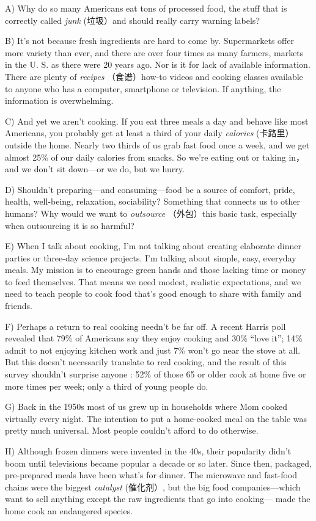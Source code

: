 \documentclass[UTF8,11pt]{ctexart}
\begin{document}
A) Why do so many Americans eat tons of processed food, the stuff that is correctly called\textit{ junk} (垃圾）and should really carry warning labels?


B) It’s not because fresh ingredients are hard to come by. Supermarkets offer more variety than ever, and there are over four times as many farmers, markets in the U. S. as there were 20 years ago. Nor is it for lack of available information. There are plenty of\textit{ recipes} （食谱）how-to videos and cooking classes available to anyone who has a computer, smartphone or television. If anything, the information is overwhelming.


C) And yet we aren’t cooking. If you eat three meals a day and behave like most Americans, you probably get at least a third of your daily\textit{ calories} (卡路里）outside the home. Nearly two thirds of us grab fast food once a week, and we get almost 25\% of our daily calories from snacks. So we’re eating out or taking in，and we don’t sit down—or we do, but we hurry.


D) Shouldn’t preparing—and consuming—food be a source of comfort, pride, health, well-being, relaxation, sociability? Something that connects us to other humans? Why would we want to\textit{ outsource} （外包）this basic task, especially when outsourcing it is so harmful?


E) When I talk about cooking, I’m not talking about creating elaborate dinner parties or three-day science projects. I’m talking about simple, easy, everyday meals. My mission is to encourage green hands and those lacking time or money to feed themselves. That means we need modest, realistic expectations, and we need to teach people to cook food that’s good enough to share with family and friends.


F) Perhaps a return to real cooking needn’t be far off. A recent Harris poll revealed that 79\% of Americans say they enjoy cooking and 30\% “love it”; 14\% admit to not enjoying kitchen work and just 7\% won’t go near the stove at all. But this doesn’t necessarily translate to real cooking, and the result of this survey shouldn’t surprise anyone : 52\% of those 65 or older cook at home five or more times per week; only a third of young people do.


G) Back in the 1950s most of us grew up in households where Mom cooked virtually every night. The intention to put a home-cooked meal on the table was pretty much universal. Most people couldn’t afford to do otherwise.


H) Although frozen dinners were invented in the 40s, their popularity didn’t boom until televisions became popular a decade or so later. Since then, packaged, pre-prepared meals have been what’s for dinner. The microwave and fast-food chains were the biggest\textit{ catalyst} (催化剂）, but the big food companies—which want to sell anything except the raw ingredients that go into cooking— made the home cook an endangered species.
\end{document}
